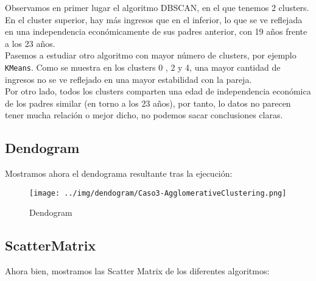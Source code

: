 	Observamos en primer lugar el algoritmo DBSCAN, en el que tenemos 2 clusters.
	En el cluster superior, hay más ingresos que en el inferior, lo que se ve reflejada en una independencia económicamente de sus padres anterior, con 19 años frente a los 23 años. \\
	
	Pasemos a estudiar otro algoritmo con mayor número de clusters, por ejemplo \texttt{KMeans}. Como se muestra en los clusters 0 , 2 y 4, una mayor cantidad de ingresos no se ve reflejado en una mayor estabilidad con la pareja. \\
	Por otro lado, todos los clusters comparten una edad de independencia económica de los padres similar (en torno a los 23 años), por tanto, lo datos no parecen tener mucha relación o mejor dicho, no podemos sacar conclusiones claras.
	
	
	\newpage
	\subsection{Dendogram}
	
	Mostramos ahora el dendograma resultante tras la ejecución:
	
	\begin{figure}[H]
		\centering
		\texttt{[image: ../img/dendogram/Caso3-AgglomerativeClustering.png]}
		
		\caption{Dendogram}
	\end{figure}
	
	
	
	\subsection{ScatterMatrix}
	
	Ahora bien, mostramos las Scatter Matrix de los diferentes algoritmos:
	
	\begin{figure}[H]
		\centering
		
	\end{figure}
	
	
	\begin{figure}[H]
		\centering
		
		
		
	\end{figure}
	
